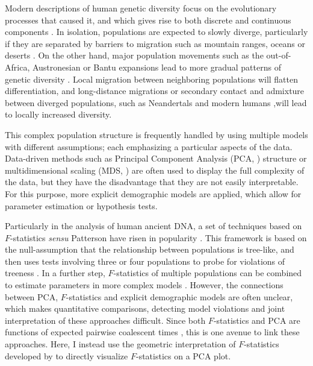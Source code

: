 \documentclass[12pt,fullpage, a4paper]{article}
\begin{document}
Modern descriptions of human genetic diversity focus on the evolutionary processes that caused it, and which gives rise to  both discrete and continuous components \citep{rosenberg2002a, serre2004, rosenberg2005, bradburd2018, reich2018a}. In isolation, populations are expected to slowly diverge, particularly if they are separated by barriers to migration such as mountain ranges, oceans or deserts \citep{bradburd2013, peter2020a, rosenberg2005}. On the other hand, major population movements such as the out-of-Africa, Austronesian or Bantu expansions lead to more gradual patterns of genetic diversity \citep{cavalli-sforza1994, ramachandran2005, novembre2008, peter2020a, stoneking2016, racimo2020}. Local migration between neighboring populations will flatten differentiation, and long-distance migrations \citep{alves2016} or secondary contact and admixture between diverged populations, such as Neandertals and modern humans \citep{green2010},will lead to locally increased diversity.

This complex population structure is frequently handled by using multiple models with different assumptions; each emphasizing a particular aspects of the data. Data-driven methods such as Principal Component Analysis (PCA, \cite{cavalli-sforza1994}) structure \citep{pritchard2000} or multidimensional scaling (MDS, \cite{malaspinas2014}) are often used to display the full complexity of the data, but they have the disadvantage that they are not easily interpretable. For this purpose, more explicit demographic models \citep{gutenkunst2009, kamm2015, excoffier2013} are applied, which allow for parameter estimation or hypothesis tests. 

Particularly in the analysis of human ancient DNA, a set of techniques based on $F$-statistics \textit{sensu} Patterson have risen in popularity \citep{patterson2012, peter2016}. This framework is based on the null-assumption that the relationship between  populations is tree-like, and then uses tests involving three or four populations to probe for violations of treeness \citep{patterson2012}. In a further step, $F$-statistics of multiple populations can be combined to estimate parameters in more complex models \citep{patterson2012, harney2021}. However, the connections between PCA, $F$-statistics and explicit demographic models are often unclear, which makes quantitative comparisons, detecting model violations and joint interpretation of these approaches difficult. Since both $F$-statistics and PCA are functions of expected pairwise coalescent times \citep{mcvean2009, peter2016}, this is one avenue to link these approaches. Here, I instead use the geometric interpretation of $F$-statistics developed by  \cite{oteo-garcia2021} to directly visualize $F$-statistics on a PCA plot. 
\end{document}
